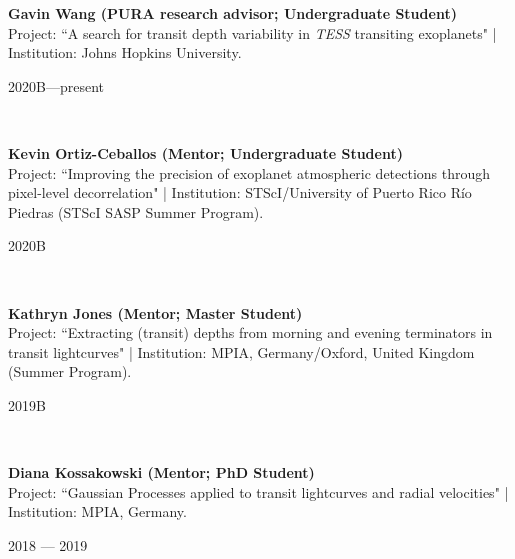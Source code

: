 \documentclass[12pt, a4paper]{article} %
\begin{document}
\begin{minipage}[t]{0.7\textwidth}
\begin{flushleft}%
  \setlength{\leftskip}{0.2cm}%
\textbf{Gavin Wang (PURA research advisor; Undergraduate Student)}\\
Project: ``A search for transit depth variability in \textit{TESS} transiting exoplanets" | Institution: Johns Hopkins University.
\end{flushleft}
\end{minipage}
\begin{minipage}[t]{0.3\textwidth}
\hfill 2020B---present
\end{minipage}\\

\begin{minipage}[t]{0.7\textwidth}
\begin{flushleft}%
  \setlength{\leftskip}{0.2cm}%
\textbf{Kevin Ortiz-Ceballos (Mentor; Undergraduate Student)}\\
Project: ``Improving the precision of exoplanet atmospheric detections through pixel-level decorrelation" | Institution: STScI/University of Puerto Rico Río Piedras (STScI SASP Summer Program).
\end{flushleft}
\end{minipage}
\begin{minipage}[t]{0.3\textwidth}
\hfill 2020B
\end{minipage}\\

\begin{minipage}[t]{0.7\textwidth}
\begin{flushleft}%
  \setlength{\leftskip}{0.2cm}%
\textbf{Kathryn Jones (Mentor; Master Student)}\\
Project: ``Extracting (transit) depths from morning and evening terminators in transit lightcurves" | Institution: MPIA, Germany/Oxford, United Kingdom (Summer Program).
\end{flushleft}
\end{minipage}
\begin{minipage}[t]{0.3\textwidth}
\hfill 2019B
\end{minipage}\\

\begin{minipage}[t]{0.7\textwidth}
\begin{flushleft}%
  \setlength{\leftskip}{0.2cm}%
\textbf{Diana Kossakowski (Mentor; PhD Student)}\\
Project: ``Gaussian Processes applied to transit lightcurves and radial velocities" | Institution: MPIA, Germany.
\end{flushleft}
\end{minipage}
\begin{minipage}[t]{0.3\textwidth}
\hfill 2018 --- 2019
\end{minipage}\\
\end{document}
